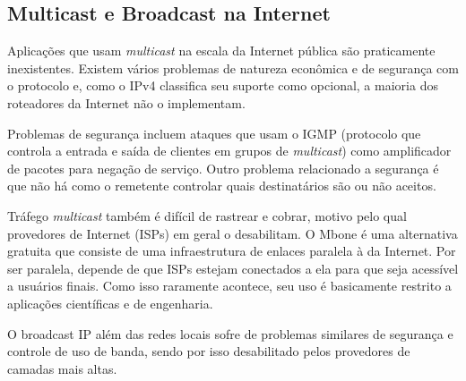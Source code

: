 \subsection*{Multicast e Broadcast na Internet}

Aplicações que usam \emph{multicast} na escala da Internet pública são
praticamente inexistentes. Existem vários problemas de natureza
econômica e de segurança com o protocolo e, como o IPv4 classifica seu
suporte como opcional, a maioria dos roteadores da Internet não o
implementam.

Problemas de segurança incluem ataques que usam o IGMP (protocolo que
controla a entrada e saída de clientes em grupos de \emph{multicast}) como
amplificador de pacotes para negação de serviço. Outro problema
relacionado a segurança é que não há como o remetente controlar quais
destinatários são ou não aceitos.

Tráfego \emph{multicast} também é difícil de rastrear e cobrar, motivo
pelo qual provedores de Internet (ISPs) em geral o desabilitam. O
Mbone é uma alternativa gratuita que consiste de uma infraestrutura de
enlaces paralela à da Internet. Por ser paralela, depende de que ISPs
estejam conectados a ela para que seja acessível a usuários
finais. Como isso raramente acontece, seu uso é basicamente restrito a
aplicações científicas e de engenharia.

O broadcast IP além das redes locais sofre de problemas similares de
segurança e controle de uso de banda, sendo por isso desabilitado
pelos provedores de camadas mais altas.


